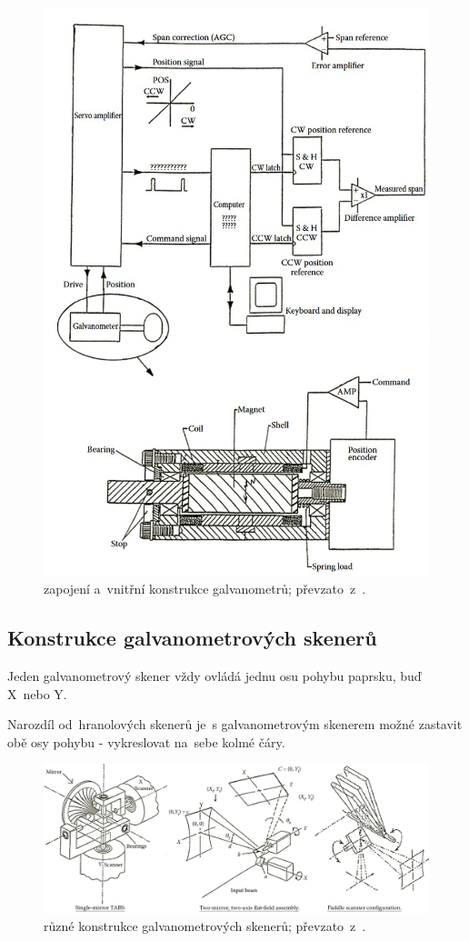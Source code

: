 \begin{figure}[htb]
  \centering
  \includegraphics[width=1\textwidth]{img/galvanometer-detail.jpg}
  \caption{\label{fig:galvanometer-detail} zapojení a~vnitřní konstrukce galvanometrů; převzato~z~\cite{scanning-handbook}.}
\end{figure}

\subsection{Konstrukce galvanometrových skenerů\label{sec:galvo-scanner-construction}}
Jeden galvanometrový skener vždy ovládá jednu osu pohybu paprsku, buď X~nebo Y.

Narozdíl od~hranolových skenerů je~s galvanometrovým skenerem možné zastavit obě osy pohybu - vykreslovat na~sebe kolmé čáry.

\begin{figure}[htb]
  \centering
  \includegraphics[width=1\textwidth]{img/scanner-constructions.jpg}
  \caption{\label{fig:scanner-constructions} různé konstrukce galvanometrových skenerů; převzato~z~\cite{scanning-handbook}.}
\end{figure}

